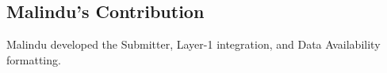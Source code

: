 \subsection{Malindu's Contribution}
\label{sec:malindu_contribution}
Malindu developed the Submitter, Layer-1 integration, and Data Availability formatting.
